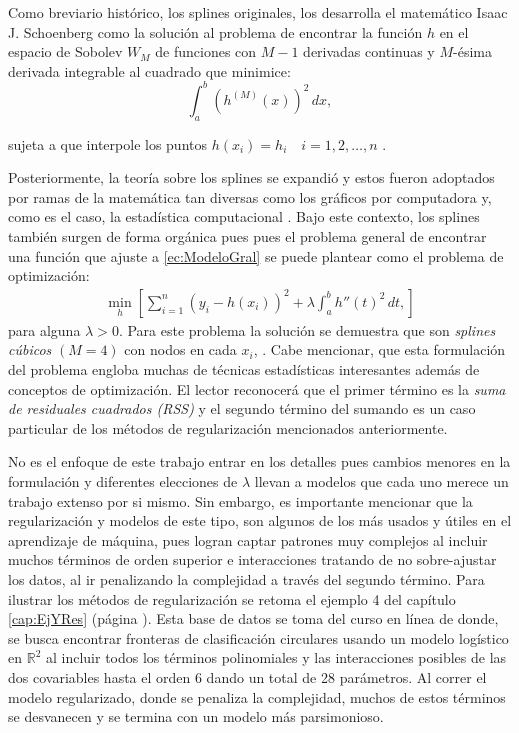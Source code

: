 \documentclass[../../Main/Main.tex]{subfiles}
\begin{document}
Como breviario histórico, los splines originales, los desarrolla  el matemático Isaac J. Schoenberg como la solución al problema de encontrar la función $h$ en el espacio de Sobolev $W_{M}$ de funciones con $M-1$ derivadas continuas y $M$-ésima derivada integrable al cuadrado que minimice:
$$\int_a^b(h^{(M)}(x))^2\,dx,$$ 

sujeta a que interpole los puntos $h(x_i) = h_i \quad i = 1,2,\ldots,n$ \autocite{schoenberg1964spline}. 

Posteriormente, la teoría sobre los splines se expandió y estos fueron adoptados por ramas de la matemática tan diversas como los gráficos por computadora y, como es el caso, la estadística computacional \citet{wahba1990splines}. Bajo este contexto, los splines también surgen de forma orgánica pues pues el problema general de encontrar una función que ajuste a \eqref{ec:ModeloGral} se puede plantear como el problema de optimización:
\begin{align}
	\min_{h}\left[ \sum_{i=1}^n(y_i - h(x_i))^2 + \lambda\int_a^b h''(t)^2 \, dt, \right] \label{ec:SplinesConRegularizacion}
\end{align}
para alguna $\lambda > 0$. Para este problema la solución se demuestra que son \textit{splines cúbicos} $(M = 4)$ con nodos en cada $x_i$, \citet{green1994nonparametric}. Cabe mencionar, que esta formulación del problema engloba muchas de técnicas estadísticas interesantes además de conceptos de optimización. El lector reconocerá que el primer término es la \textit{suma de residuales cuadrados (RSS)} y el segundo término del sumando es un caso particular de los métodos de regularización mencionados anteriormente. 

No es el enfoque de este trabajo entrar en los detalles pues cambios menores en la formulación y diferentes elecciones de $\lambda$ llevan a modelos que cada uno merece un trabajo extenso por si mismo. Sin embargo, es importante mencionar que la regularización y modelos de este tipo, son algunos de los más usados y útiles en el aprendizaje de máquina, pues logran captar patrones muy complejos al incluir muchos términos de orden superior e interacciones tratando de no sobre-ajustar los datos, al ir penalizando la complejidad a través del segundo término. Para ilustrar los métodos de regularización se retoma el ejemplo 4 del capítulo \ref{cap:EjYRes} (página \pageref{tab:T4}). Esta base de datos se toma del curso en línea de \citet{andrew2018ml} donde, se busca encontrar fronteras de clasificación circulares usando un modelo logístico en $\mathbb{R}^2$ al incluir todos los términos polinomiales y las interacciones posibles de las dos covariables hasta el orden 6 dando un total de 28 parámetros. Al correr el modelo regularizado, donde se penaliza la complejidad, muchos de estos términos se desvanecen y se termina con un modelo más parsimonioso. 
\end{document}

